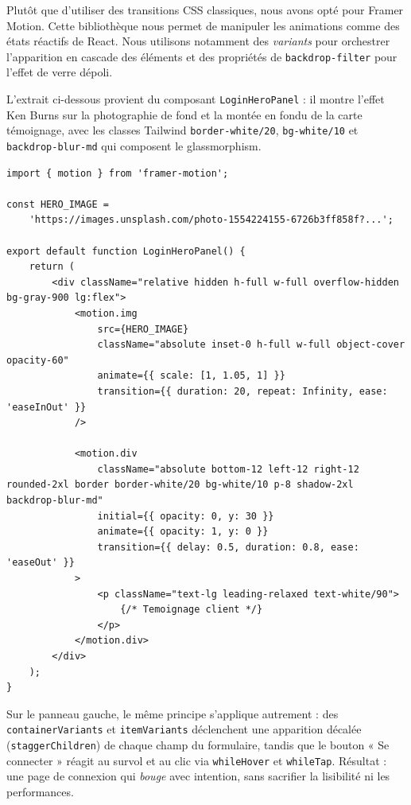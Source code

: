 \documentclass[12pt,a4paper]{report}
\begin{document}
Plutôt que d'utiliser des transitions CSS classiques, nous avons opté pour Framer Motion. Cette bibliothèque nous permet de manipuler les animations comme des états réactifs de React. Nous utilisons notamment des \emph{variants} pour orchestrer l'apparition en cascade des éléments et des propriétés de \texttt{backdrop-filter} pour l'effet de verre dépoli.

L'extrait ci-dessous provient du composant \texttt{LoginHeroPanel} : il montre l'effet Ken Burns sur la photographie de fond et la montée en fondu de la carte témoignage, avec les classes Tailwind \texttt{border-white/20}, \texttt{bg-white/10} et \texttt{backdrop-blur-md} qui composent le glassmorphism.

\begin{lstlisting}[style=jsstyle,caption={Implémentation du Glassmorphism et des animations d'entrée avec Framer Motion (\texttt{login-hero-panel.jsx})}]
import { motion } from 'framer-motion';

const HERO_IMAGE =
    'https://images.unsplash.com/photo-1554224155-6726b3ff858f?...';

export default function LoginHeroPanel() {
    return (
        <div className="relative hidden h-full w-full overflow-hidden bg-gray-900 lg:flex">
            <motion.img
                src={HERO_IMAGE}
                className="absolute inset-0 h-full w-full object-cover opacity-60"
                animate={{ scale: [1, 1.05, 1] }}
                transition={{ duration: 20, repeat: Infinity, ease: 'easeInOut' }}
            />

            <motion.div
                className="absolute bottom-12 left-12 right-12 rounded-2xl border border-white/20 bg-white/10 p-8 shadow-2xl backdrop-blur-md"
                initial={{ opacity: 0, y: 30 }}
                animate={{ opacity: 1, y: 0 }}
                transition={{ delay: 0.5, duration: 0.8, ease: 'easeOut' }}
            >
                <p className="text-lg leading-relaxed text-white/90">
                    {/* Temoignage client */}
                </p>
            </motion.div>
        </div>
    );
}
\end{lstlisting}

Sur le panneau gauche, le même principe s'applique autrement : des \texttt{containerVariants} et \texttt{itemVariants} déclenchent une apparition décalée (\texttt{staggerChildren}) de chaque champ du formulaire, tandis que le bouton « Se connecter » réagit au survol et au clic via \texttt{whileHover} et \texttt{whileTap}. Résultat : une page de connexion qui \emph{bouge} avec intention, sans sacrifier la lisibilité ni les performances.
\end{document}
